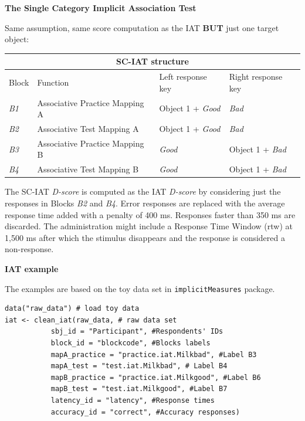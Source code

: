 \documentclass[a0,landscape]{a0poster}
\begin{document}
\begin{multicols*}{3}
\vspace{5mm}
\begin{center}
	\Large \textbf{\textcolor{title}{The Single Category Implicit Association Test}}
\end{center}
\vspace{5mm}

Same assumption, same score computation as the IAT \textbf{BUT} just one target object: 
\vspace{5mm}

\begin{center}
	\begin{tabular}{llll}
		\multicolumn{4}{c}{SC-IAT structure \label{tab:sciat}}\\
		\toprule
		Block & Function & Left response key & Right response key  \\
		\midrule
		\emph{B1} & Associative Practice Mapping A & Object 1 + \emph{Good} & \emph{Bad} \\
		\textcolor{comp}{\emph{B2} } & \textcolor{comp}{Associative Test Mapping A} & \textcolor{comp}{Object 1 + \emph{Good}} & \textcolor{comp}{\emph{Bad}} \\
		\emph{B3} & Associative Practice Mapping B & \emph{Good} & Object 1 + \emph{Bad} \\
		\textcolor{inc}{\emph{B4}} & \textcolor{inc}{Associative Test Mapping B} & \textcolor{inc}{ \emph{Good}} & \textcolor{inc}{Object 1 + \emph{Bad} }\\
		\bottomrule
	\end{tabular}
\end{center}

\vspace{5mm}
The SC-IAT \emph{D-score} is computed as the IAT \emph{D-score} by considering just the responses in Blocks \emph{B2} and \emph{B4}. Error responses are replaced with the average response time added with a penalty of 400 ms. Responses faster than 350 ms are discarded. The administration might include a Response Time Window (rtw) at 1,500 ms after which the stimulus disappears and the response is considered a non-response. 



\vfill\null
\columnbreak

\begin{center}
	\huge \textbf{\textcolor{title}{IAT example}}
\end{center}

The examples are based on the toy data set in \texttt{implicitMeasures} package. 
\vspace{3mm}
\begin{lstlisting}
data("raw_data") # load toy data
iat <- clean_iat(raw_data, # raw data set 
           sbj_id = "Participant", #Respondents' IDs
           block_id = "blockcode", #Blocks labels
           mapA_practice = "practice.iat.Milkbad", #Label B3
           mapA_test = "test.iat.Milkbad", # Label B4
           mapB_practice = "practice.iat.Milkgood", #Label B6
           mapB_test = "test.iat.Milkgood", #Label B7
           latency_id = "latency", #Response times
           accuracy_id = "correct", #Accuracy responses)
\end{lstlisting}
\vspace{3mm}


\end{multicols*}
\end{document}
